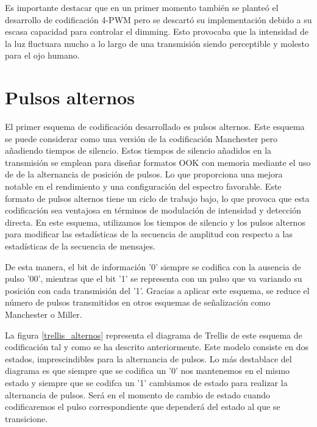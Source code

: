 Es importante destacar que en un primer momento también se planteó el desarrollo de codificación 4-PWM pero se descartó su 
implementación debido a su escasa capacidad para controlar el dimming. Esto provocaba que la intensidad de la luz 
fluctuara mucho a lo largo de una transmisión siendo perceptible y molesto para el ojo humano.

\section{Pulsos alternos}
El primer esquema de codificación desarrollado es pulsos alternos. Este esquema 
se puede considerar como una versión de la codificación Manchester pero
añadiendo tiempos de silencio. Estos tiempos de silencio añadidos en la transmisión
se emplean para diseñar formatos OOK con memoria mediante el uso de de la alternancia de
posición de pulsos. Lo que proporciona una mejora notable en el rendimiento y una 
configuración del espectro favorable. 
Este formato de pulsos alternos tiene un ciclo de trabajo bajo, lo que provoca que esta 
codificación sea ventajosa en términos de modulación de intensidad y detección directa. 
En este esquema, utilizamos los tiempos de silencio y los pulsos alternos para
modificar las estadísticas de la secuencia de amplitud con respecto a las estadísticas de 
la secuencia de mensajes.

De esta manera, el bit de información '0' siempre se codifica con la ausencia de pulso 
'00', mientras que el bit '1' se representa con un pulso que va variando su posición con
cada transmisión del '1'. Gracias a aplicar este esquema, se reduce el número de pulsos 
transmitidos en otros esquemas de señalización como Manchester o Miller.

La figura \ref{trellis_alternos} representa el diagrama de Trellis de este esquema de 
codificación tal y como se ha descrito anteriormente. Este modelo consiste en dos estados,
imprescindibles para la alternancia de pulsos. Lo más destablace del diagrama es que 
siempre que se codifica un '0' nos mantenemos en el mismo estado y siempre que se 
codifca un '1' cambiamos de estado para realizar la alternancia de pulsos. Será en el 
momento de cambio de estado cuando codificaremos el pulso correspondiente que dependerá 
del estado al que se transicione.
\vspace{1cm}

